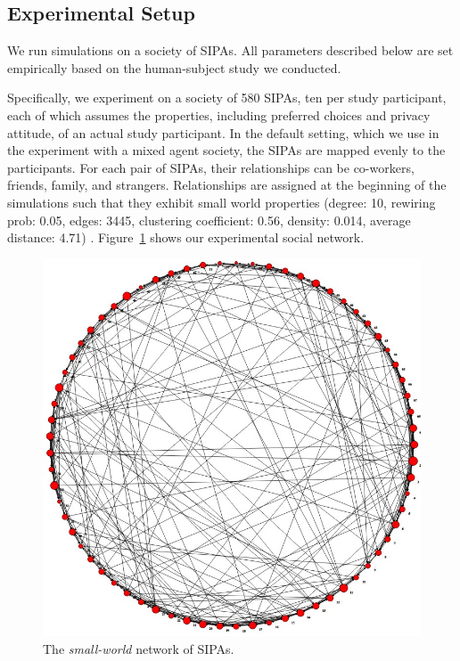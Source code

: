 \subsection{Experimental Setup}


We run simulations on a society of \locationapp SIPAs. All parameters described below are set empirically based on the human-subject study we conducted.

Specifically, we experiment on a society of 580 SIPAs, ten per study participant, each of which assumes the properties, including preferred choices and privacy attitude, of an actual study participant. In the default setting, which we use in the experiment with a mixed agent society, the SIPAs are mapped evenly to the participants. For each pair of SIPAs, their relationships can be co-workers, friends, family, and strangers.
Relationships are assigned at the beginning of the simulations such that they exhibit small world properties 
(degree: 10, rewiring prob: 0.05, edges: 3445, clustering coefficient: 0.56, density: 0.014, average distance: 4.71) 
\citep{Watts+Strogatz-98}. Figure~\ref{fig:smallworld-69d10p50} shows our experimental social network.

\begin{figure}[!htb]
    \centering
    \includegraphics[width=0.6\columnwidth]{./Chapter-5/fig/smallworld-69d10p50.jpg}
    \caption[The \emph{small-world} network of SIPAs]{The \emph{small-world} network of SIPAs.}
    \label{fig:smallworld-69d10p50}
\end{figure}

